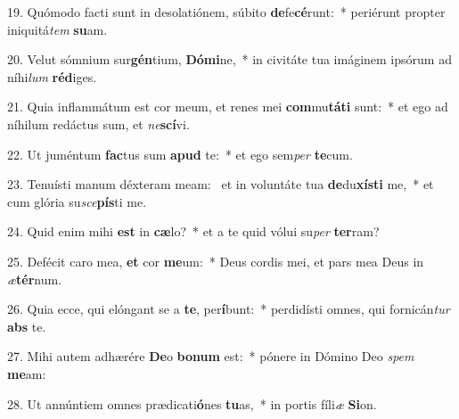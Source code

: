 19. Quómodo facti sunt in desolatiónem, súbito \textbf{de}fe\textbf{cé}runt:~*  periérunt propter iniquitá\textit{tem} \textbf{su}am.\

20. Velut sómnium sur\textbf{gén}tium, \textbf{Dó}\textbf{mi}ne,~*  in civitáte tua imáginem ipsórum ad níhi\textit{lum} \textbf{réd}iges.\

21. Quia inflammátum est cor meum, et renes mei \textbf{com}mu\textbf{tá}\textbf{ti} sunt:~*  et ego ad níhilum redáctus sum, et \textit{ne}\textbf{scí}vi.\

22. Ut juméntum \textbf{fac}tus sum \textbf{a}\textbf{pud} te:~*  et ego sem\textit{per} \textbf{te}cum.\

23. Tenuísti manum déxteram meam: \dag\  et in voluntáte tua \textbf{de}du\textbf{xís}\textbf{ti} me,~*  et cum glória su\textit{sce}\textbf{pís}ti me.\

24. Quid enim mihi \textbf{est} in \textbf{cæ}lo?~*  et a te quid vólui su\textit{per} \textbf{ter}ram?\

25. Defécit caro mea, \textbf{et} cor \textbf{me}um:~*  Deus cordis mei, et pars mea Deus in \textit{æ}\textbf{tér}num.\

26. Quia ecce, qui elóngant se a \textbf{te}, per\textbf{í}bunt:~*  perdidísti omnes, qui fornicán\textit{tur} \textbf{abs} te.\

27. Mihi autem adhærére \textbf{De}o \textbf{bo}\textbf{num} est:~*  pónere in Dómino Deo \textit{spem} \textbf{me}am:\

28. Ut annúntiem omnes prædicati\textbf{ó}nes \textbf{tu}as,~*  in portis fíli\textit{æ} \textbf{Si}on.\

